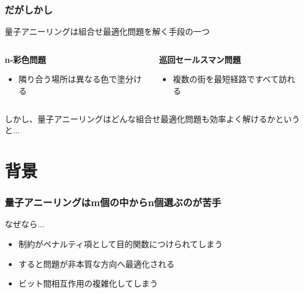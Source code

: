 \begin{frame}
  \frametitle{だがしかし}

  {\Large  量子アニーリングは組合せ最適化問題を解く手段の一つ}
  \vspace{5mm}

  \begin{columns}
    \begin{column}{0.45\textwidth}
      \textbf{n-彩色問題}
      \begin{itemize}
          \item 隣り合う場所は異なる色で塗分ける
      \end{itemize}
    \end{column}

    \begin{column}{0.45\textwidth}
      \textbf{巡回セールスマン問題}
      \begin{itemize}
          \item 複数の街を最短経路ですべて訪れる
      \end{itemize}
    \end{column}
  \end{columns}
  \vspace{10mm}
  {\color{important_font}しかし、量子アニーリングはどんな組合せ最適化問題も効率よく解けるかというと...}
\end{frame}

\section{背景}
\begin{frame}
  \frametitle{量子アニーリングはm個の中からn個選ぶのが苦手}
  
  なぜなら...\\
  \begin{itemize}
    \item 制約がペナルティ項として目的関数につけられてしまう
    \item すると問題が非本質な方向へ最適化される\cite{Okada_2019}
    \item ビット間相互作用の複雑化してしまう\cite{boothby2019d}
  \end{itemize}

  \vspace{5mm}



\end{frame}

